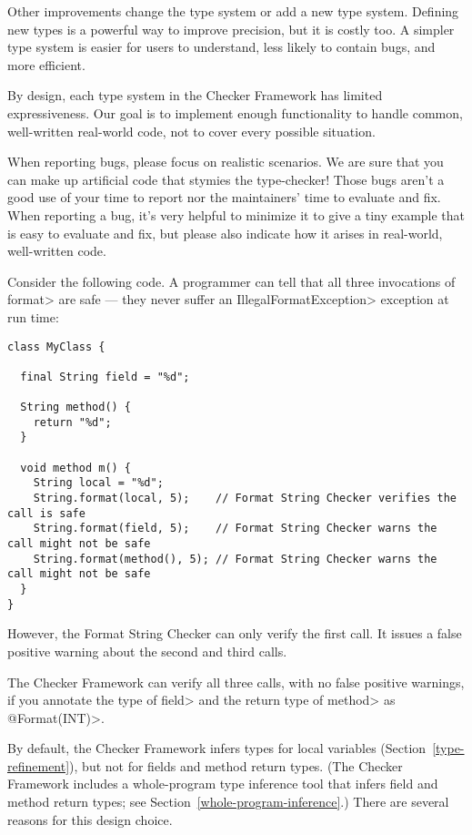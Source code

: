 Other improvements change the type system or add a new type system.
Defining new types is a powerful way to improve precision, but it is costly
too.  A simpler type system is easier for users to understand, less likely
to contain bugs, and more efficient.

By design, each type system in the Checker Framework has limited
expressiveness.  Our goal is to implement enough functionality to handle
common, well-written real-world code, not to cover every possible
situation.

When reporting bugs, please focus on realistic scenarios.  We are sure that
you can make up artificial code that stymies the type-checker!  Those bugs
aren't a good use of your time to report nor the maintainers' time to
evaluate and fix.  When reporting a bug, it's very helpful to minimize it
to give a tiny example that is easy to evaluate and fix, but please also
indicate how it arises in real-world, well-written code.



Consider the following code.  A programmer can tell that all three
invocations of \<format> are safe --- they never suffer an
\<IllegalFormatException> exception at run time:

\begin{Verbatim}
class MyClass {

  final String field = "%d";

  String method() {
    return "%d";
  }

  void method m() {
    String local = "%d";
    String.format(local, 5);    // Format String Checker verifies the call is safe
    String.format(field, 5);    // Format String Checker warns the call might not be safe
    String.format(method(), 5); // Format String Checker warns the call might not be safe
  }
}
\end{Verbatim}

\noindent
However, the Format String Checker can only verify the first call.  It issues a
false positive warning about the second and third calls.

The Checker Framework can verify all three calls, with no false positive
warnings, if you annotate the type of \<field> and the return type of
\<method> as \<@Format(INT)>.

By default, the Checker Framework infers types for local variables
(Section~\ref{type-refinement}), but not for fields and method return
types.  (The Checker Framework includes a whole-program type inference tool
that infers field and method return types; see
Section~\ref{whole-program-inference}.)
There are several reasons for this design choice.

